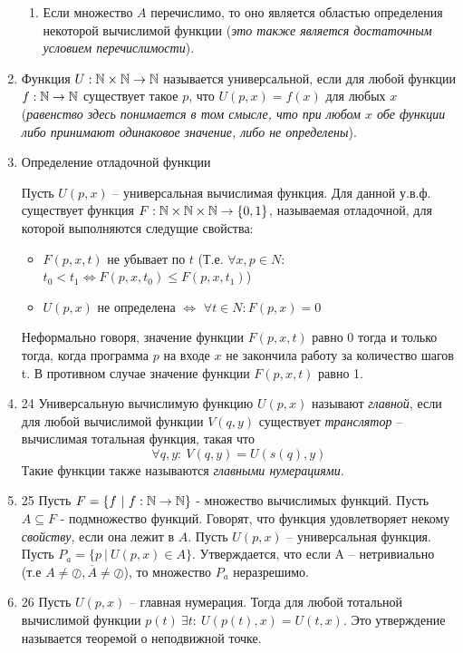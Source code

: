 \documentclass[a4paper,12pt]{article}
\begin{document}
\begin{enumerate}
\begin{enumerate}
            \item Если множество $A$ перечислимо, то оно является областью определения некоторой вычислимой функции (\textit{это также является достаточным условием перечислимости}).
        \end{enumerate}
        \item
        Функция $U:\mathbb{N}\times\mathbb{N}\to\mathbb{N}$ называется универсальной, если для любой функции $f: \mathbb{N}\to\mathbb{N}$ существует такое $p$, что $U(p, x)=f(x)$ для любых $x$ (\textit{равенство здесь понимается в том смысле, что при любом $x$ обе функции либо принимают одинаковое значение, либо не определены}).




        \item Определение отладочной функции

        Пусть $U(p, x)$ -- универсальная вычислимая функция. Для данной у.в.ф. существует функция $F: \mathbb{N} \times \mathbb{N} \times \mathbb{N} \rightarrow \{0, 1\}$, называемая отладочной, для которой выполняются следущие свойства:
        \begin{itemize}
            \item $F(p, x, t)$ не убывает по $t$ (Т.е. $\forall x, p \in N:$ $t_0 < t_1 \Leftrightarrow F(p, x, t_0) \le F(p, x, t_1)$)

            \item $U(p, x)$ не определена $\Leftrightarrow$ $\forall t \in N: F(p, x) = 0$
        \end{itemize}

        Неформально говоря, значение функции $F(p, x, t)$ равно 0 тогда и только тогда, когда программа $p$ на входе $x$ не закончила работу за количество шагов t. В противном случае значение функции 
        $F(p, x, t)$ равно 1.

        
		\item 24
		Универсальную вычислимую функцию $U(p, x)$ называют \textit{главной}, если для любой вычислимой функции $V(q, y)$ существует \textit{транслятор} -- вычислимая тотальная функция, такая что 
		\[
		\forall q, y: \ V(q, y) = U(s(q), y)
		\]
		Такие функции также называются \textit{главными нумерациями}.
		\item 25
		Пусть $F = \{ f \ | \ f : \mathbb{N} \rightarrow \mathbb{N} \}$ - множество вычислимых функций. Пусть $A \subseteq F$ - подмножество функций. Говорят, что функция удовлетворяет некому \textit{свойству}, если она лежит в $A$. Пусть $U(p, x)$ -- универсальная функция. Пусть $P_a = \{ p \ | \ U(p, x) \in A \}$. Утверждается, что если A -- нетривиально (т.е $A \neq \oslash, \overline{A} \neq \oslash$), то множество $P_a$ неразрешимо.
    	\item 26
        Пусть $U(p, x)$ -- главная нумерация. Тогда для любой тотальной вычислимой функции $p(t) \  \exists t: \ U(p(t), x) = U(t, x)$. Это утверждение называется теоремой о неподвижной точке.
	\end{enumerate}
		
	
\end{document}
